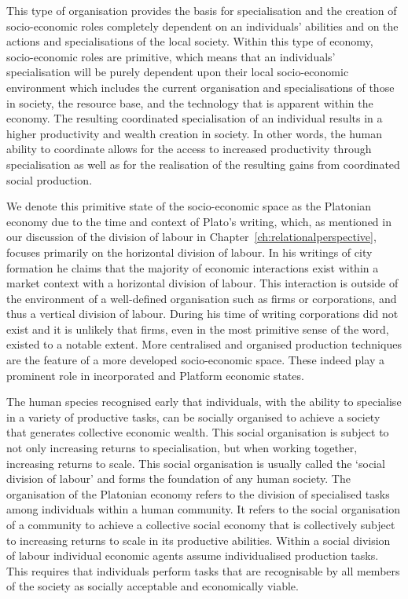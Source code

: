 This type of organisation provides the basis for specialisation and the creation of socio-economic roles completely dependent on an individuals' abilities and on the actions and specialisations of the local society. Within this type of economy, socio-economic roles are primitive, which means that an individuals' specialisation will be purely dependent upon their local socio-economic environment which includes the current organisation and specialisations of those in society, the resource base, and the technology that is apparent within the economy. The resulting coordinated specialisation of an individual results in a higher productivity and wealth creation in society. In other words, the human ability to coordinate allows for the access to increased productivity through specialisation as well as for the realisation of the resulting gains from coordinated social production.

We denote this primitive state of the socio-economic space as the Platonian economy due to the time and context of Plato's writing, which, as mentioned in our discussion of the division of labour in Chapter~\ref{ch:relationalperspective}, focuses primarily on the horizontal division of labour. In his writings of city formation he claims that the majority of economic interactions exist within a market context with a horizontal division of labour. This interaction is outside of the environment of a well-defined organisation such as firms or corporations, and thus a vertical division of labour. During his time of writing corporations did not exist and it is unlikely that firms, even in the most primitive sense of the word, existed to a notable extent. More centralised and organised production techniques are the feature of a more developed socio-economic space. These indeed play a prominent role in incorporated and Platform economic states.

The human species recognised early that individuals, with the ability to specialise in a variety of productive tasks, can be socially organised to achieve a society that generates collective economic wealth. This social organisation is subject to not only increasing returns to specialisation, but when working together, increasing returns to scale. This social organisation is usually called the `social division of labour' and forms the foundation of any human society. The organisation of the Platonian economy refers to the division of specialised tasks among individuals within a human community. It refers to the social organisation of a community to achieve a collective social economy that is collectively subject to increasing returns to scale in its productive abilities. Within a social division of labour individual economic agents assume individualised production tasks. This requires that individuals perform tasks that are recognisable by all members of the society as socially acceptable and economically viable.

